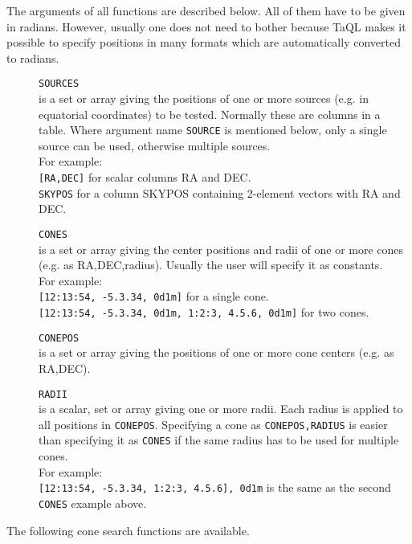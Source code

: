 The arguments of all functions are described below. All of them have
to be given in radians. However, usually one does not need to bother
because TaQL makes it possible
to specify positions in many formats which are automatically converted
to radians.
\begin{description}
  \item[] \texttt{SOURCES}\\
       is a set or array giving the positions of one or more
       sources (e.g. in equatorial coordinates)
       to be tested. Normally these are columns in a table.
       Where argument name \texttt{SOURCE} is mentioned below, only a
       single source can be used, otherwise multiple sources.
       \\For example:
       \\\texttt{[RA,DEC]} for scalar columns RA and DEC.
       \\\texttt{SKYPOS} for a column SKYPOS containing 2-element
       vectors with RA and DEC.
  \item[] \texttt{CONES}\\
       is a set or array giving the center positions and radii of
       one or more cones (e.g. as RA,DEC,radius).
       Usually the user will specify it as constants.
       \\For example:
       \\\texttt{[12:13:54, -5.3.34, 0d1m]} for a single cone.
       \\\texttt{[12:13:54, -5.3.34, 0d1m, 1:2:3, 4.5.6, 0d1m]} for two cones.
  \item[] \texttt{CONEPOS}\\
       is a set or array giving the positions of one or more
       cone centers (e.g. as RA,DEC).
  \item[] \texttt{RADII}\\
       is a scalar, set or array giving one or more radii.
       Each radius is applied to all positions in \texttt{CONEPOS}.
       Specifying a cone as \texttt{CONEPOS,RADIUS} is easier than specifying
       it as \texttt{CONES} if the same radius has to be used for
       multiple cones.
       \\For example:
       \\\texttt{[12:13:54, -5.3.34, 1:2:3, 4.5.6], 0d1m} is the same
       as the second \texttt{CONES} example above.
\end{description}
The following cone search functions are available.
